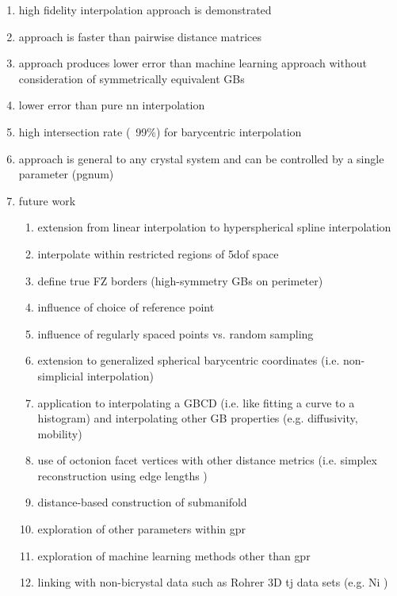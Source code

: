 \documentclass[preprint,12pt]{elsarticle}
\begin{document}
\begin{enumerate}
    \item high fidelity interpolation approach is demonstrated
    \item approach is faster than pairwise distance matrices
    \item approach produces lower error than machine learning approach without consideration of symmetrically equivalent GBs
    \item lower error than pure \gls{nn} interpolation
    \item high intersection rate (~99\%) for barycentric interpolation
    \item approach is general to any crystal system and can be controlled by a single parameter (pgnum)
    \item future work
    \begin{enumerate}
        \item extension from linear interpolation to hyperspherical spline interpolation \cite{taijeronSplineInterpolationSmoothing1994}
        \item interpolate within restricted regions of \gls{5dof} space
        \item define true FZ borders (high-symmetry GBs on perimeter)
        \item influence of choice of reference point
        \item influence of regularly spaced points vs. random sampling
        \item extension to generalized spherical barycentric coordinates (i.e. non-simplicial interpolation) \cite{langerSphericalBarycentricCoordinates2006}
        \item application to interpolating a GBCD (i.e. like fitting a curve to a histogram) and interpolating other GB properties (e.g. diffusivity, mobility)
        \item use of octonion facet vertices with other distance metrics (i.e. simplex reconstruction using edge lengths \cite{connorHighdimensionalSimplexesSupermetric2017})
        \item distance-based construction of submanifold \cite{boissonnatOnlyDistancesAre2017}
        \item exploration of other parameters within \gls{gpr}
        \item exploration of machine learning methods other than \gls{gpr}
        \item linking with non-bicrystal data such as Rohrer 3D \gls{tj} data sets (e.g. Ni \cite{liRelativeGrainBoundary2009})
    \end{enumerate}
\end{enumerate}
\end{document}

